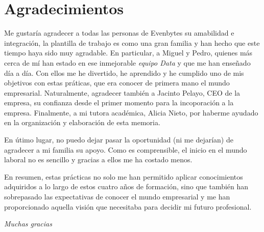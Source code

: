 \chapter*{Agradecimientos}
%
%
Me gustaría agradecer a todas las personas de Evenbytes su amabilidad e integración, la plantilla de trabajo es como una gran familia y han hecho que este tiempo haya sido muy agradable. En particular, a Miguel y Pedro, quienes más cerca de mí han estado en ese inmejorable \textit{equipo Data} y que me han enseñado día a día. Con ellos me he divertido, he aprendido y he cumplido uno de mis objetivos con estas práticas, que era conocer de primera mano el mundo empresarial. Naturalmente, agradecer también a Jacinto Pelayo, CEO de la empresa, su confianza desde el primer momento para la incoporación a la empresa. Finalmente, a mi tutora académica, Alicia Nieto, por haberme ayudado en la organización y elaboración de esta memoria.

En útimo lugar, no puedo dejar pasar la oportunidad (ni me dejarían) de agradecer a mi familia su apoyo. Como es comprensible, el inicio en el mundo laboral no es sencillo y gracias a ellos me ha costado menos.

En resumen, estas prácticas no solo me han permitido aplicar conocimientos adquiridos a lo largo de estos cuatro años de formación, sino que también han sobrepasado las expectativas de conocer el mundo empresarial y me han proporcionado aquella visión que necesitaba para decidir mi futuro profesional.

\begin{flushright}
    \textit{Muchas gracias}
\end{flushright}